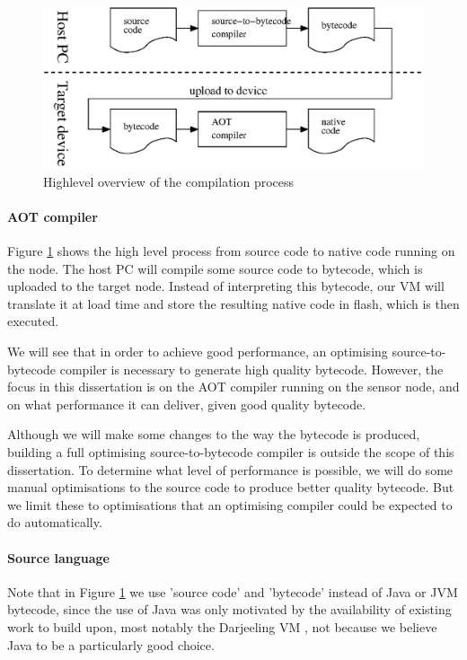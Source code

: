 \begin{figure}
\centering
\includegraphics[width=0.8\linewidth]{compilation-process-highlevel.eps}
\caption{Highlevel overview of the compilation process}
\label{fig-compilation-process-highlevel}
\end{figure}

\paragraph{AOT compiler}
Figure \ref{fig-compilation-process-highlevel} shows the high level process from source code to native code running on the node. The host PC will compile some source code to bytecode, which is uploaded to the target node. Instead of interpreting this bytecode, our VM will translate it at load time and store the resulting native code in flash, which is then executed.

We will see that in order to achieve good performance, an optimising source-to-bytecode compiler is necessary to generate high quality bytecode. However, the focus in this dissertation is on the AOT compiler running on the sensor node, and on what performance it can deliver, given good quality bytecode.

Although we will make some changes to the way the bytecode is produced, building a full optimising source-to-bytecode compiler is outside the scope of this dissertation. To determine what level of performance is possible, we will do some manual optimisations to the source code to produce better quality bytecode. But we limit these to optimisations that an optimising compiler could be expected to do automatically.

\paragraph{Source language}
Note that in Figure \ref{fig-compilation-process-highlevel} we use 'source code' and 'bytecode' instead of Java or JVM bytecode, since the use of Java was only motivated by the availability of existing work to build upon, most notably the Darjeeling VM \cite{Brouwers:2009cj}, not because we believe Java to be a particularly good choice.

